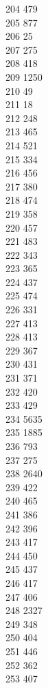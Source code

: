 { 204	479 \\
 205	877 \\
 206	25 \\
 207	275 \\
 208	418 \\
 209	1250 \\
 210	49 \\
 211	18 \\
 212	248 \\
 213	465 \\
 214	521 \\
 215	334 \\
 216	456 \\
 217	380 \\
 218	474 \\
 219	358 \\
 220	457 \\
 221	483 \\
 222	343 \\
 223	365 \\
 224	437 \\
 225	474 \\
 226	331 \\
 227	413 \\
 228	413 \\
 229	367 \\
 230	431 \\
 231	371 \\
 232	420 \\
 233	429 \\
 234	5635 \\
 235	1885 \\
 236	793 \\
 237	275 \\
 238	2640 \\
 239	422 \\
 240	465 \\
 241	386 \\
 242	396 \\
 243	417 \\
 244	450 \\
 245	437 \\
 246	417 \\
 247	406 \\
 248	2327 \\
 249	348 \\
 250	404 \\
 251	446 \\
 252	362 \\
 253	407 \\
}
